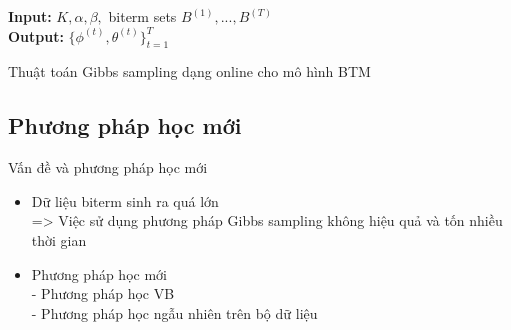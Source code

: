 \documentclass[pdf]{beamer}
\begin{document}
\begin{frame}
\begin{algorithm}[H]
\textbf{Input: }  $K, \alpha , \beta, $ biterm sets $B^{(1)}, ..., B^{(T)}$  \\
\textbf{Output:} $\{\phi^{(t)}, \theta^{(t)} \}_{t=1}^T$
\begin{algorithmic}[1]
\ENDFOR
{}
\ENDFOR
{}
\ENDFOR
\end{algorithmic}
\caption{Thuật toán Gibbs sampling dạng online cho mô hình BTM }
\label{alg:seq}
\end{algorithm}
\end{frame}

\subsection{Phương pháp học mới}
\begin{frame}{Vấn đề và phương pháp học mới}
	\begin{itemize}
		\item Dữ liệu biterm sinh ra quá lớn\\
		=> Việc sử dụng phương pháp Gibbs sampling không hiệu quả và tốn nhiều thời gian
		\item Phương pháp học mới \\
		- Phương pháp học VB \\
		- Phương pháp học ngẫu nhiên trên bộ dữ liệu
	\end{itemize} 
\end{frame}
\end{document}
